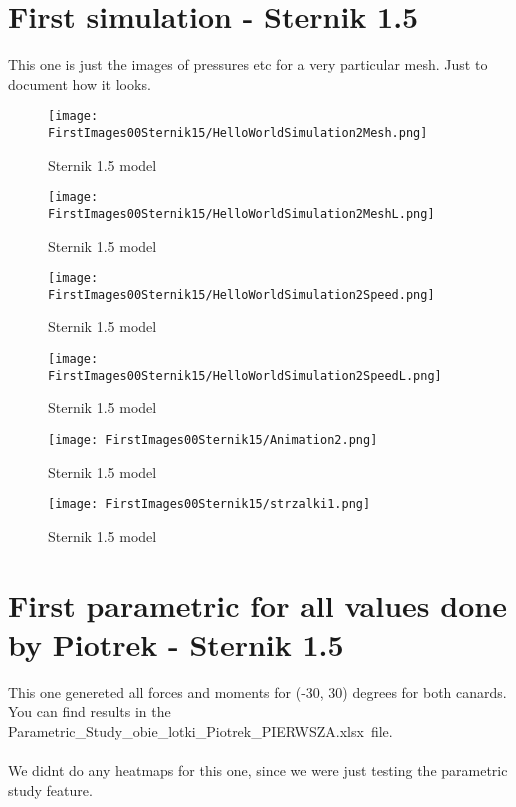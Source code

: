 \section{First simulation - Sternik 1.5}
This one is just the images of pressures etc for a very particular mesh. Just to document how it 
looks.

\begin{figure}[H]
    \centering
    \texttt{[image: FirstImages00Sternik15/HelloWorldSimulation2Mesh.png]}
    \caption{Sternik 1.5 model}
\end{figure}


\begin{figure}[H]
    \centering
    \texttt{[image: FirstImages00Sternik15/HelloWorldSimulation2MeshL.png]}
    \caption{Sternik 1.5 model}
\end{figure}

\begin{figure}[H]
    \centering
    \texttt{[image: FirstImages00Sternik15/HelloWorldSimulation2Speed.png]}
    \caption{Sternik 1.5 model}
\end{figure}


\begin{figure}[H]
    \centering
    \texttt{[image: FirstImages00Sternik15/HelloWorldSimulation2SpeedL.png]}
    \caption{Sternik 1.5 model}
\end{figure}


\begin{figure}[H]
    \centering
    \texttt{[image: FirstImages00Sternik15/Animation2.png]}
    \caption{Sternik 1.5 model}
\end{figure}

\begin{figure}[H]
    \centering
    \texttt{[image: FirstImages00Sternik15/strzalki1.png]}
    \caption{Sternik 1.5 model}
\end{figure}

\section{First parametric for all values done by Piotrek - Sternik 1.5}
This one genereted all forces and moments for (-30, 30) degrees for both canards. You can find 
results in the Parametric\_Study\_obie\_lotki\_Piotrek\_PIERWSZA.xlsx\ file. \\\\
We didnt do any heatmaps for this one, since we were just testing the parametric study feature.

